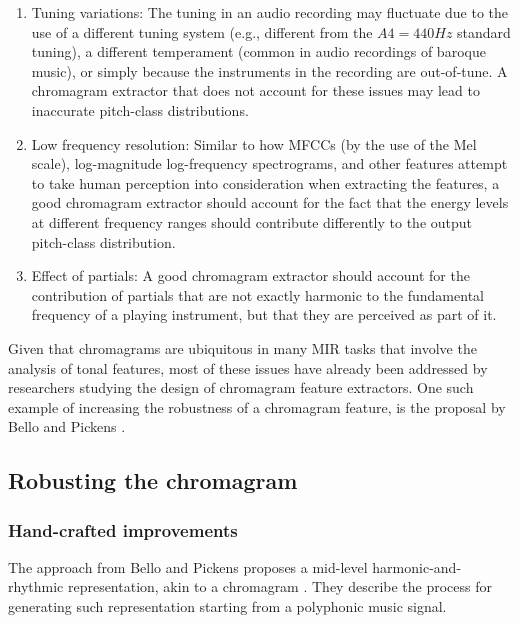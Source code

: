 \begin{enumerate}
    \item Tuning variations: The tuning in an audio recording may fluctuate due to the use of a different tuning system (e.g., different from the $A4=440Hz$ standard tuning), a different temperament (common in audio recordings of baroque music), or simply because the instruments in the recording are out-of-tune. A chromagram extractor that does not account for these issues may lead to inaccurate pitch-class distributions.
    \item Low frequency resolution: Similar to how MFCCs (by the use of the Mel scale), log-magnitude log-frequency spectrograms, and other features attempt to take human perception into consideration when extracting the features, a good chromagram extractor should account for the fact that the energy levels at different frequency ranges should contribute differently to the output pitch-class distribution.
    \item Effect of partials: A good chromagram extractor should account for the contribution of partials that are not exactly harmonic to the fundamental frequency of a playing instrument, but that they are perceived as part of it.
\end{enumerate}

Given that chromagrams are ubiquitous in many MIR tasks that involve the analysis of tonal features, most of these issues have already been addressed by researchers studying the design of chromagram feature extractors. One such example of increasing the robustness of a chromagram feature, is the proposal by Bello and Pickens \cite{bello_robust_2005}.

\subsection{Robusting the chromagram}

\subsubsection{Hand-crafted improvements}
The approach from Bello and Pickens proposes a mid-level harmonic-and-rhythmic representation, akin to a chromagram \cite{bello_robust_2005}. They describe the process for generating such representation starting from a polyphonic music signal.

